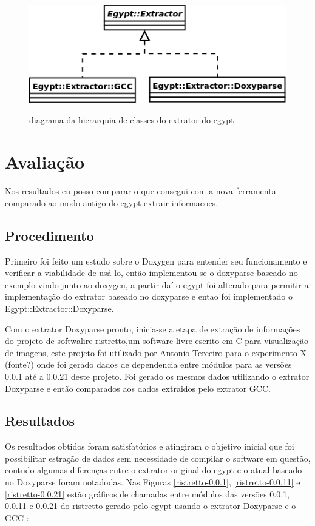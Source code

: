 \begin{figure}[h]
\center
\includegraphics[scale=0.5]{imagens/egypt-diagram-extractor}
\label{egypt-diagram-extractor}
\caption{diagrama da hierarquia de classes do extrator do egypt}
\end{figure}

\chapter{Avaliação}

Nos resultados eu posso comparar o que consegui com a nova ferramenta comparado ao modo antigo do egypt extrair informacoes.

\section{Procedimento}

Primeiro foi feito um estudo sobre o Doxygen para entender seu funcionamento e verificar a viabilidade de usá-lo, então implementou-se o doxyparse baseado no exemplo vindo junto ao doxygen, a partir daí o egypt foi alterado para permitir a implementação do extrator baseado no doxyparse e entao foi implementado o Egypt::Extractor::Doxyparse.

Com o extrator Doxyparse pronto, inicia-se a etapa de extração de informações do projeto de softwalire ristretto,um software livre escrito em C para visualização de imagens, este projeto foi utilizado por Antonio Terceiro para o experimento X (fonte?) onde foi gerado dados de dependencia entre módulos para as versões 0.0.1 até a 0.0.21 deste projeto. Foi gerado os mesmos dados utilizando o extrator Doxyparse e então comparados aos dados extraidos pelo extrator GCC.

\section{Resultados}

Os resultados obtidos foram satisfatórios e atingiram o objetivo inicial que foi possibilitar estração de dados sem necessidade de compilar o software em questão, contudo algumas diferenças entre o extrator original do egypt e o atual baseado no Doxyparse foram notadodas. Nas Figuras \ref{ristretto-0.0.1}, \ref{ristretto-0.0.11} e \ref{ristretto-0.0.21} estão gráficos de chamadas entre módulos das versões 0.0.1, 0.0.11 e 0.0.21 do ristretto gerado pelo egypt usando o extrator Doxyparse e o GCC :

